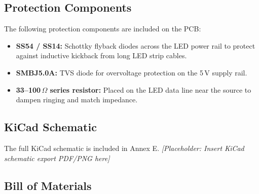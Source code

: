 \subsection{Protection Components}
\label{sec:protection}

The following protection components are included on the PCB:

\begin{itemize}
  \item \textbf{SS54 / SS14:} Schottky flyback diodes across the LED power rail to protect against inductive kickback from long LED strip cables.
  \item \textbf{SMBJ5.0A:} TVS diode for overvoltage protection on the 5\,V supply rail.
  \item \textbf{33--100\,$\Omega$ series resistor:} Placed on the LED data line near the source to dampen ringing and match impedance.
\end{itemize}

\subsection{KiCad Schematic}
\label{sec:schematic}

The full KiCad schematic is included in Annex E. \textit{[Placeholder: Insert KiCad schematic export PDF/PNG here]}

\subsection{Bill of Materials}
\label{sec:bom}

